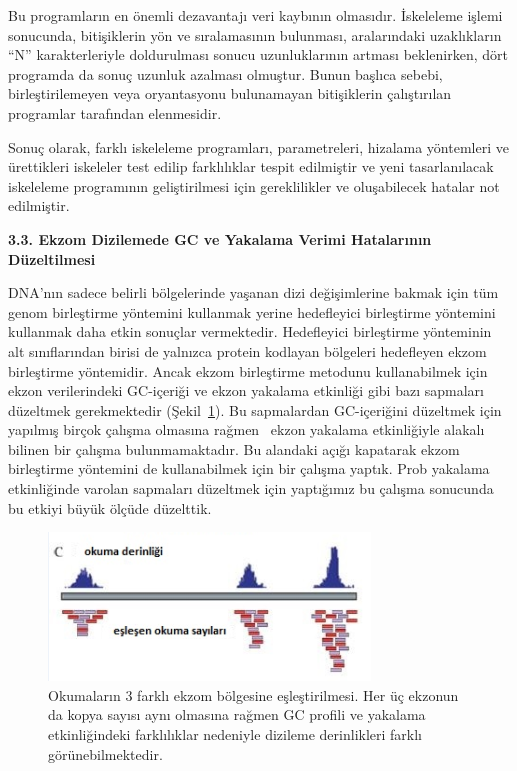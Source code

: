 \documentclass[11pt]{article}
\begin{document}
Bu programların en önemli dezavantajı veri kaybının olmasıdır. İskeleleme işlemi sonucunda, bitişiklerin yön ve sıralamasının bulunması, aralarındaki uzaklıkların ``N'' 
karakterleriyle doldurulması sonucu uzunluklarının artması beklenirken, dört programda da sonuç uzunluk azalması olmuştur. Bunun başlıca sebebi, birleştirilemeyen veya oryantasyonu bulunamayan bitişiklerin çalıştırılan programlar tarafından elenmesidir.

Sonuç olarak, farklı iskeleleme programları, parametreleri, hizalama yöntemleri ve ürettikleri iskeleler test edilip farklılıklar tespit edilmiştir ve yeni tasarlanılacak iskeleleme programının geliştirilmesi için gereklilikler ve oluşabilecek hatalar not edilmiştir.

{\bf \large 3.3. Ekzom Dizilemede GC ve Yakalama Verimi Hatalarının Düzeltilmesi}

DNA'nın sadece belirli bölgelerinde yaşanan dizi değişimlerine bakmak için tüm genom birleştirme yöntemini kullanmak yerine hedefleyici birleştirme yöntemini kullanmak daha etkin sonuçlar vermektedir. Hedefleyici birleştirme yönteminin alt sınıflarından birisi de yalnızca protein kodlayan bölgeleri hedefleyen ekzom birleştirme yöntemidir. Ancak ekzom birleştirme metodunu kullanabilmek için ekzon verilerindeki GC-içeriği ve ekzon yakalama etkinliği gibi bazı sapmaları düzeltmek gerekmektedir (Şekil~\ref{fig:exomedepth}). Bu sapmalardan GC-içeriğini düzeltmek için yapılmış birçok çalışma olmasına rağmen~\cite{Krumm2012,Fromer2012} ekzon yakalama etkinliğiyle alakalı bilinen bir çalışma bulunmamaktadır. Bu alandaki açığı kapatarak ekzom birleştirme yöntemini de kullanabilmek için bir çalışma yaptık. Prob yakalama etkinliğinde varolan sapmaları düzeltmek için yaptığımız bu çalışma sonucunda bu etkiyi büyük ölçüde düzelttik. 


\begin{figure}[htb]
\begin{center}
  \includegraphics[scale=0.75]{exomedepth.png}
\end{center}
\caption{Okumaların 3 farklı ekzom bölgesine eşleştirilmesi. Her üç ekzonun da kopya sayısı aynı olmasına rağmen GC profili ve yakalama etkinliğindeki farklılıklar nedeniyle dizileme derinlikleri farklı görünebilmektedir.}
\label{fig:exomedepth}
\end{figure}
\end{document}
